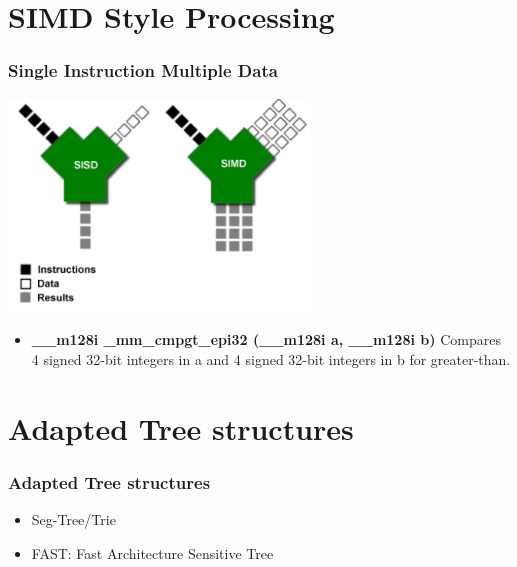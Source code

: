 \documentclass{beamer}
\begin{document}
\section{SIMD Style Processing}
\begin{frame}
\frametitle{Single Instruction Multiple Data}
\begin{center}
	\includegraphics[width=0.6\textwidth]{img/simd.png}
\end{center}
\begin{itemize}
	\item \textbf{\_\_m128i \_mm\_cmpgt\_epi32 (\_\_m128i a, \_\_m128i b)} Compares 4 signed 32-bit integers in a and 4 signed 32-bit integers
	in b for greater-than.
\end{itemize}
\end{frame}
\section{Adapted Tree structures}

\begin{frame}
\frametitle{Adapted Tree structures}
\begin{itemize}
	\item Seg-Tree/Trie
	\item FAST: Fast Architecture Sensitive Tree
\end{itemize}
\end{frame}
\end{document}

